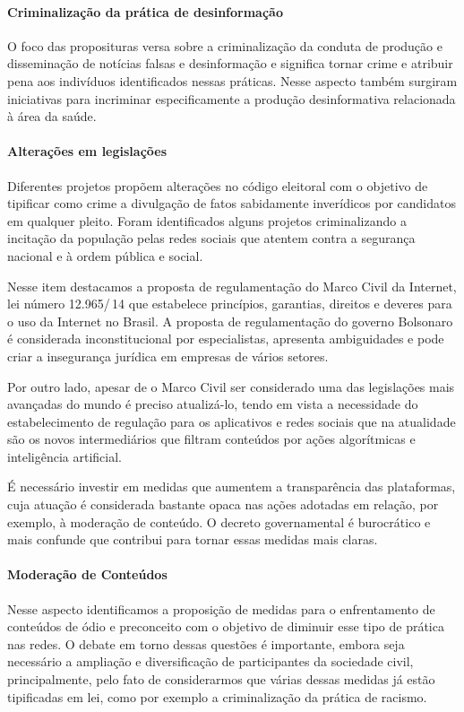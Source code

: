 \paragraph{Criminalização da prática de desinformação} O foco das proposituras versa sobre a criminalização da conduta de
produção e disseminação de notícias falsas e desinformação e significa
tornar crime e atribuir pena aos indivíduos identificados nessas
práticas. Nesse aspecto também surgiram iniciativas para incriminar
especificamente a produção desinformativa relacionada à área da saúde.

\paragraph{Alterações em legislações} Diferentes projetos propõem alterações no código eleitoral com o objetivo de tipificar como crime a divulgação de fatos sabidamente inverídicos por candidatos em qualquer pleito. Foram identificados alguns projetos criminalizando a incitação da população pelas redes sociais que atentem contra a segurança nacional e à ordem pública e social.

Nesse item destacamos a proposta de regulamentação do Marco Civil da Internet, lei número 12.965/\,14 que estabelece princípios, garantias, direitos e deveres para o uso da Internet no Brasil. A proposta de regulamentação do governo Bolsonaro é considerada inconstitucional por especialistas, apresenta ambiguidades e pode criar a insegurança jurídica em empresas de vários setores.

Por outro lado, apesar de o Marco Civil ser considerado uma das legislações mais avançadas do mundo é preciso atualizá-lo, tendo em vista a necessidade do estabelecimento de regulação para os aplicativos e redes sociais que na atualidade são os novos intermediários que filtram conteúdos por ações algorítmicas e inteligência artificial.

É necessário investir em medidas que aumentem a transparência das plataformas, cuja atuação é considerada bastante opaca nas ações adotadas em relação, por exemplo, à moderação de conteúdo. O decreto governamental é burocrático e mais confunde que contribui para tornar essas medidas mais claras.

\paragraph{Moderação de Conteúdos} Nesse aspecto identificamos a proposição de medidas para o enfrentamento de conteúdos de ódio e preconceito com o objetivo de diminuir esse tipo de prática nas redes. O debate em torno dessas questões é importante, embora seja necessário a ampliação e diversificação de participantes da sociedade civil, principalmente, pelo fato de considerarmos que várias dessas medidas já estão tipificadas em lei, como por exemplo a
criminalização da prática de racismo.

